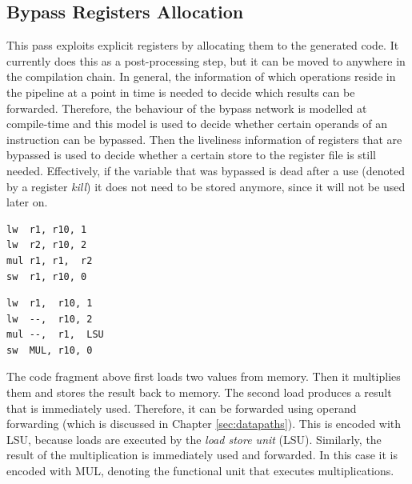 
\subsection{Bypass Registers Allocation}
This pass exploits explicit registers by allocating them to the generated code. It currently does this as a post-processing step, but it can be moved to anywhere in the compilation chain. In general, the information of which operations reside in the pipeline at a point in time is needed to decide which results can be forwarded. Therefore, the behaviour of the bypass network is modelled at compile-time and this model is used to decide whether certain operands of an instruction can be bypassed. Then the liveliness information of registers that are bypassed is used to decide whether a certain store to the register file is still needed. Effectively, if the variable that was bypassed is dead after a use (denoted by a register \emph{kill}) it does not need to be stored anymore, since it will not be used later on. 

\label{lst:explicit_reg_alloc}
\begin{center}
\hspace{2px}\begin{minipage}{.475\textwidth}
\begin{lstlisting}[frame=tlrb]
lw  r1, r10, 1
lw  r2, r10, 2
mul r1, r1,  r2
sw  r1, r10, 0
\end{lstlisting}
\end{minipage}\hfill
\begin{minipage}{.475\textwidth}
\begin{lstlisting}[frame=tlrb]
lw  r1,  r10, 1
lw  --,  r10, 2
mul --,  r1,  LSU
sw  MUL, r10, 0
\end{lstlisting}
\end{minipage}
\end{center}

The code fragment above first loads two values from memory. Then it multiplies them and stores the result back to memory. The second load produces a result that is immediately used. Therefore, it can be forwarded using operand forwarding (which is discussed in Chapter \ref{sec:datapaths}). This is encoded with LSU, because loads are executed by the \emph{load store unit} (LSU). Similarly, the result of the multiplication is immediately used and forwarded. In this case it is encoded with MUL, denoting the functional unit that executes multiplications.

